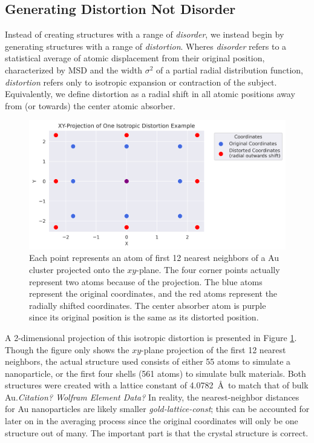 \subsection{Generating Distortion Not Disorder} \label{sec:start-disorder}
Instead of creating structures with a range of \textit{disorder}, we instead begin by generating structures with a range of \textit{distortion}. Wheres \textit{disorder} refers to a statistical average of atomic displacement from their original position, characterized by MSD and the width $ \sigma^2 $ of a partial radial distribution function, \textit{distortion} refers only to isotropic expansion or contraction of the subject. Equivalently, we define distortion as a radial shift in all atomic positions away from (or towards) the center atomic absorber.

\begin{figure}[h]
	\centering
	\includegraphics[width=\linewidth]{Chapters/Figures/2d_distortion_example.png}
	\caption[2D Distortion]{Each point represents an atom of first 12 nearest neighbors of a Au cluster projected onto the $xy$\nobreakdash-plane. The four corner points actually represent two atoms because of the projection. The blue atoms represent the original coordinates, and the red atoms represent the radially shifted coordinates. The center absorber atom is purple since its original position is the same as its distorted position.}
	\label{fig:2d-distortion}
\end{figure}

A 2-dimensional projection of this isotropic distortion is presented in Figure \ref{fig:2d-distortion}. Though the figure only shows the $xy$\nobreakdash-plane projection of the first 12 nearest neighbors, the actual structure used consists of either 55 atoms to simulate a nanoparticle, or the first four shells (561 atoms) to simulate bulk materials. Both structures were created with a lattice constant of 4.0782~\AA~to match that of bulk Au.\textit{Citation? Wolfram Element Data?} In reality, the nearest-neighbor distances for Au nanoparticles are likely smaller \textit{gold-lattice-const}; this can be accounted for later on in the averaging process since the original coordinates will only be one structure out of many. The important part is that the crystal structure is correct. 

